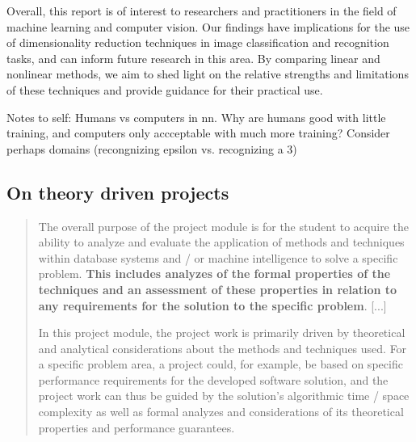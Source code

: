 Overall, this report is of interest to researchers and practitioners in the field of machine learning and computer vision. Our findings have implications for the use of dimensionality reduction techniques in image classification and recognition tasks, and can inform future research in this area. By comparing linear and nonlinear methods, we aim to shed light on the relative strengths and limitations of these techniques and provide guidance for their practical use.





Notes to self: Humans vs computers in \gls{nn}. Why are humans good with little training, and computers only accceptable with much more training? Consider perhaps domains (recongnizing epsilon vs. recognizing a 3)


\subsection*{On theory driven projects}
\blockcquote{Projectmodule}{The overall purpose of the project module is for the student to acquire the ability to analyze and evaluate the application of methods and techniques within database systems and / or machine intelligence to solve a specific problem. \textbf{This includes analyzes of the formal properties of the techniques and an assessment of these properties in relation to any requirements for the solution to the specific problem}. [...]

In this project module, the project work is primarily driven by theoretical and analytical considerations about the methods and techniques used. For a specific problem area, a project could, for example, be based on specific performance requirements for the developed software solution, and the project work can thus be guided by the solution's algorithmic time / space complexity as well as formal analyzes and considerations of its theoretical properties and performance guarantees.}



